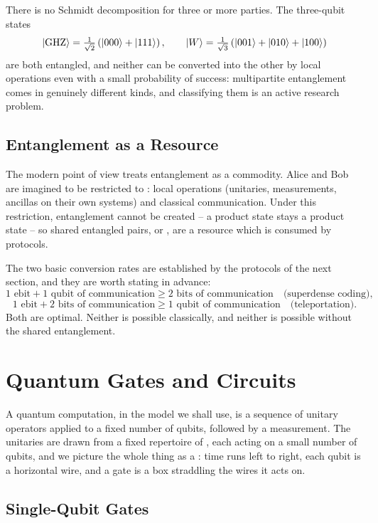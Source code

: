 \documentclass[a4paper]{scrartcl}
\begin{document}
\begin{remark}
	There is no Schmidt decomposition for three or more parties. The three-qubit states
	$$\ket{\mathrm{GHZ}} = \tfrac1{\sqrt2}\left(\ket{000}+\ket{111}\right), \qquad \ket{W} = \tfrac1{\sqrt3}\left(\ket{001}+\ket{010}+\ket{100}\right)$$
	are both entangled, and neither can be converted into the other by local operations even with a small probability of success: multipartite entanglement comes in genuinely different kinds, and classifying them is an active research problem.
\end{remark}

\subsection{Entanglement as a Resource}

The modern point of view treats entanglement as a commodity. Alice and Bob are imagined to be restricted to : local operations (unitaries, measurements, ancillas on their own systems) and classical communication. Under this restriction, entanglement cannot be created -- a product state stays a product state -- so shared entangled pairs, or , are a resource which is consumed by protocols.

The two basic conversion rates are established by the protocols of the next section, and they are worth stating in advance:
$$1 \text{ ebit} + 1 \text{ qubit of communication} \geq 2 \text{ bits of communication}\quad \text{(superdense coding)},$$
$$1 \text{ ebit} + 2 \text{ bits of communication} \geq 1 \text{ qubit of communication} \quad \text{(teleportation)}.$$
Both are optimal. Neither is possible classically, and neither is possible without the shared entanglement.

\section{Quantum Gates and Circuits}\label{sec:gates}

A quantum computation, in the model we shall use, is a sequence of unitary operators applied to a fixed number of qubits, followed by a measurement. The unitaries are drawn from a fixed repertoire of , each acting on a small number of qubits, and we picture the whole thing as a : time runs left to right, each qubit is a horizontal wire, and a gate is a box straddling the wires it acts on.

\subsection{Single-Qubit Gates}
\end{document}
